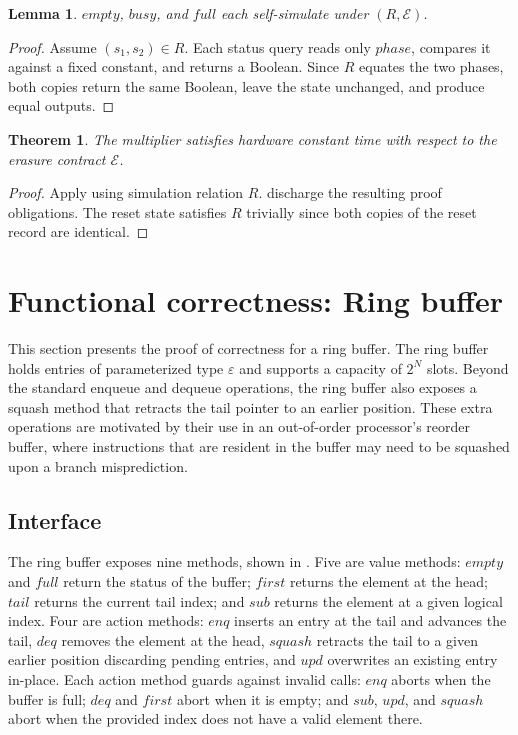 \documentclass[fontset=fira-newtxsf]{mitthesis}
\theoremstyle{definition}
\theoremstyle{plain}
\newtheorem{lemma}{Lemma}[section]
\newtheorem{theorem}{Theorem}[section]
\begin{document}
\begin{lemma} \label{lem:mult-status}
$\mathit{empty}$, $\mathit{busy}$, and $\mathit{full}$ each self-simulate under $(R, \mathcal E)$.
\end{lemma}

\begin{proof}[Proof]
Assume $(s_1, s_2) \in R$.
Each status query reads only $\mathit{phase}$, compares it against a fixed constant, and returns a Boolean.
Since $R$ equates the two phases, both copies return the same Boolean, leave the state unchanged, and produce equal outputs.
\end{proof}

\begin{theorem} \label{thm:mult-hct}
The multiplier satisfies hardware constant time with respect to the erasure contract $\mathcal E$.
\end{theorem}

\begin{proof}[Proof]
Apply  using simulation relation $R$.
 discharge the resulting proof obligations.
The reset state satisfies $R$ trivially since both copies of the reset record are identical.
\end{proof}

\section{Functional correctness: Ring buffer} \label{sec:case-study-ring-buffer}

This section presents the proof of correctness for a ring buffer.
The ring buffer holds entries of parameterized type $\varepsilon$ and supports a capacity of $2^N$ slots.
Beyond the standard enqueue and dequeue operations, the ring buffer also exposes a squash method that retracts the tail pointer to an earlier position.
These extra operations are motivated by their use in an out-of-order processor's reorder buffer, where instructions that are resident in the buffer may need to be squashed upon a branch misprediction.

\subsection{Interface}

The ring buffer exposes nine methods, shown in .
Five are value methods: $\mathit{empty}$ and $\mathit{full}$ return the status of the buffer; $\mathit{first}$ returns the element at the head; $\mathit{tail}$ returns the current tail index; and $\mathit{sub}$ returns the element at a given logical index.
Four are action methods: $\mathit{enq}$ inserts an entry at the tail and advances the tail, $\mathit{deq}$ removes the element at the head, $\mathit{squash}$ retracts the tail to a given earlier position discarding pending entries, and $\mathit{upd}$ overwrites an existing entry in-place.
Each action method guards against invalid calls: $\mathit{enq}$ aborts when the buffer is full; $\mathit{deq}$ and $\mathit{first}$ abort when it is empty; and $\mathit{sub}$, $\mathit{upd}$, and $\mathit{squash}$ abort when the provided index does not have a valid element there.
\end{document}
